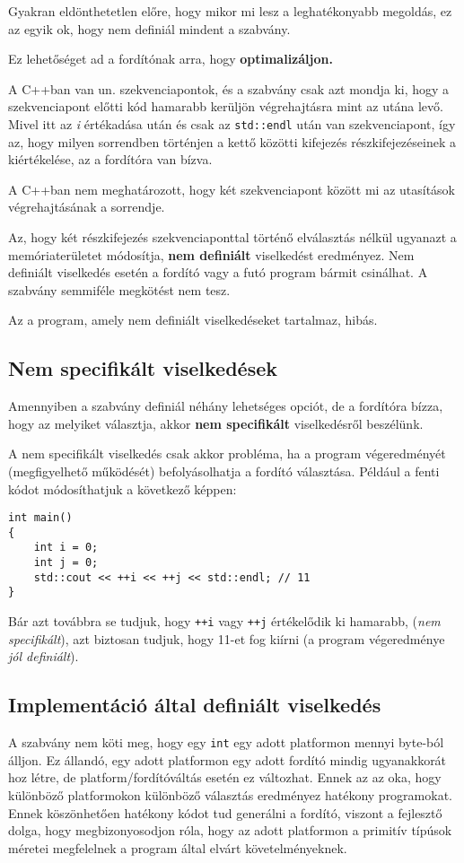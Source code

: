 \documentclass[a4paper,11.5pt,table]{article}
\begin{document}
	Gyakran eldönthetetlen előre, hogy mikor mi lesz a leghatékonyabb megoldás, ez az egyik ok, hogy nem definiál mindent a szabvány.
	\medskip
	
	Ez lehetőséget ad a fordítónak arra, hogy \textbf{optimalizáljon.} 
	\medskip
	
	A C++ban van un. szekvenciapontok, és a szabvány csak azt mondja ki, hogy a szekvenciapont előtti kód hamarabb kerüljön végrehajtásra mint az utána levő. Mivel itt az \textit{i} értékadása után és csak az \texttt{std::endl} után van szekvenciapont, így az, hogy milyen sorrendben történjen a kettő közötti kifejezés részkifejezéseinek a kiértékelése, az a fordítóra van bízva.
	\medskip
	
	A C++ban nem meghatározott, hogy két szekvenciapont között mi az utasítások végrehajtásának a sorrendje.
	
	\medskip
	Az, hogy két részkifejezés szekvenciaponttal történő elválasztás nélkül ugyanazt a memóriaterületet módosítja, \textbf{nem definiált} viselkedést eredményez. Nem definiált viselkedés esetén a fordító vagy a futó program bármit csinálhat. A szabvány semmiféle megkötést nem tesz.
	\begin{note}
		Az a program, amely nem definiált viselkedéseket tartalmaz, hibás.
	\end{note}
	\subsection{Nem specifikált viselkedések}
	Amennyiben a szabvány definiál néhány lehetséges opciót, de a fordítóra bízza, hogy az melyiket választja, akkor \textbf{nem specifikált} viselkedésről beszélünk.
	
  A nem specifikált viselkedés csak akkor probléma, ha a program végeredményét (megfigyelhető működését) befolyásolhatja a fordító választása. Például a fenti kódot módosíthatjuk a következő képpen:

	\begin{lstlisting}
int main()
{
	int i = 0;
	int j = 0;
	std::cout << ++i << ++j << std::endl; // 11
}
	\end{lstlisting}
	Bár azt továbbra se tudjuk, hogy \texttt{++i} vagy \texttt{++j} értékelődik ki hamarabb, (\textit{nem specifikált}), azt biztosan tudjuk, hogy 11-et fog kiírni (a program végeredménye \textit{jól definiált}).
	\subsection{Implementáció által definiált viselkedés}
	A szabvány nem köti meg, hogy egy \texttt{int} egy adott platformon mennyi byte-ból álljon. Ez állandó, egy adott platformon egy adott fordító mindig ugyanakkorát hoz létre, de platform/fordítóváltás esetén ez változhat. Ennek az az oka, hogy különböző platformokon különböző választás eredményez hatékony programokat. Ennek köszönhetően hatékony kódot tud generálni a fordító, viszont a fejlesztő dolga, hogy megbizonyosodjon róla, hogy az adott platformon a primitív típúsok méretei megfelelnek a program által elvárt követelményeknek.
	
\end{document}
